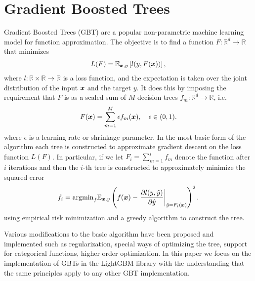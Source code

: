 \section{Gradient Boosted Trees}
Gradient Boosted Trees (GBT) \cite{friedman2001greedy} are a popular non-parametric machine learning model for
function approximation.
The objective is to find a function $F: \mathbb{R}^d \to \mathbb{R}$ that minimizes
\begin{align}
    L(F) = \mathbb{E}_{\boldsymbol{x}, y} \left[ l(y, F(\boldsymbol{x})) \right],
\end{align}
where $l: \mathbb{R} \times \mathbb{R} \to \mathbb{R}$ is a loss function, and the expectation is taken over the joint distribution
of the input $\boldsymbol{x}$ and the target $y$.
It does this by imposing the requirement that $F$ is as a scaled sum of $M$ decision
trees $f_m: \mathbb{R}^d \to \mathbb{R}$, i.e.
\begin{align}
    F(\boldsymbol{x}) = \sum_{m = 1}^{M} \epsilon f_m(\boldsymbol{x}), \quad \epsilon \in (0, 1).
\end{align}
where $\epsilon$ is a learning rate or shrinkage parameter.
In the most basic form of the algorithm each tree is constructed to approximate gradient descent on the loss function $L(F)$.
In particular, if we let $F_i = \sum_{m = 1}^{i} f_m$ denote the function after $i$ iterations and
then the $i$-th tree is constructed to approximately minimize the squared error
\begin{align}
    f_i = \text{argmin}_{f} \mathbb{E}_{\boldsymbol{x}, y} \left( f(\boldsymbol{x}) - \left. \frac{\partial l(y, \hat{y})}{\partial \hat{y}}\right|_{\hat{y} = F_i(\boldsymbol{x})} \right)^2.
\end{align}
using empirical risk minimization and a greedy algorithm to construct the tree.

Various modifications to the basic algorithm have been proposed and implemented such as
regularization, special ways of optimizing the tree, support for categorical functions,
higher order optimization\cite{chen2016xgboost, ke2018lightgbm,prokhorenkova2019catboost}.
In this paper we focus on the implementation of GBTs in the LightGBM library \cite{ke2018lightgbm}
with the understanding that the same principles apply to any other GBT implementation.
